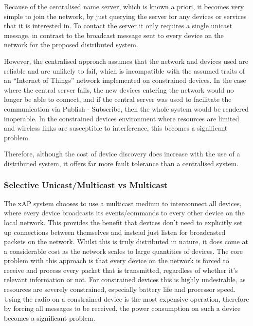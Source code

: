 Because of the centralised name server, which is known a priori, it becomes very simple to join the network, by just querying the server for any devices or services that it is interested in.  To contact the server it only requires a single unicast message, in contrast to the broadcast message sent to every device on the network for the proposed distributed system. 

However, the centralised approach assumes that the network and devices used are reliable and are unlikely to fail, which is incompatible with the assumed traits of an ``Internet of Things'' network implemented on constrained devices. In the case where the central server fails, the new devices entering the network would no longer be able to connect, and if the central server was used to facilitate the communication via Publish - Subscribe, then the whole system would be rendered inoperable. In the constrained devices environment where resources are limited and wireless links are susceptible to interference, this becomes a significant problem.

Therefore, although the cost of device discovery does increase with the use of a distributed system, it offers far more fault tolerance than a centralised system.


\subsubsection{Selective Unicast/Multicast vs Multicast} %
\label{ssub:selective_unicast_multicast_vs_multicast}
The xAP system chooses to use a multicast medium to interconnect all devices, where every device broadcasts its events/commands to every other device on the local network. This provides the benefit that devices don't need to explicitly set up connections between themselves and instead just listen for broadcasted packets on the network. Whilst this is truly distributed in nature, it does come at a considerable cost as the network scales to large quantities of devices. The core problem with this approach is that every device on the network is forced to receive and process every packet that is transmitted, regardless of whether it's relevant information or not. For constrained devices this is highly undesirable, as resources are severely constrained, especially battery life and processor speed. Using the radio on a constrained device is the most expensive operation, therefore by forcing all messages to be received, the power consumption on such a device becomes a significant problem. 

